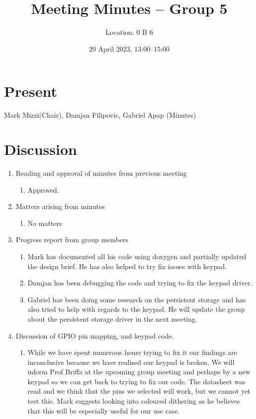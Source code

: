\documentclass[11pt,a4paper]{scrartcl}
\title{Meeting Minutes -- Group 5}
\author{Location: 0 B 6}
\date{20 April 2023, 13:00--15:00}
\begin{document}
\maketitle

\section*{Present}
Mark Mizzi(Chair),
Damjan Filipovic,
Gabriel Apap (Minutes)

\section*{Discussion}

\begin{enumerate}
\item Reading and approval of minutes from previous meeting
\begin{enumerate}
    \item Approved.
\end{enumerate}

\item Matters arising from minutes
\begin{enumerate}
    \item No matters
\end{enumerate}

\item Progress report from group members
\begin{enumerate}
    \item Mark has documented all his code using doxygen and partially updated the design brief. He has also helped to try fix issues with keypad.
    \item Damjan has been debugging the code and trying to fix the keypad driver.
    \item Gabriel has been doing some research on the persistent storage and has also tried to help with regards to the keypad. He will update the group about the persistent storage driver in the next meeting.
\end{enumerate}

\item Discussion of GPIO pin mapping, and keypad code.
\begin{enumerate}
    \item While we have spent numerous hours trying to fix it our findings are inconclusive because we have realised our keypad is broken. We will inform Prof Briffa at the upcoming group meeting and perhaps by a new keypad so we can get back to trying to fix our code. The datasheet was read and we think that the pins we selected will work, but we cannot yet test this. Mark suggests looking into coloured dithering as he believes that this will be especially useful for our use case.
\end{enumerate}


\end{enumerate}
\end{document}
